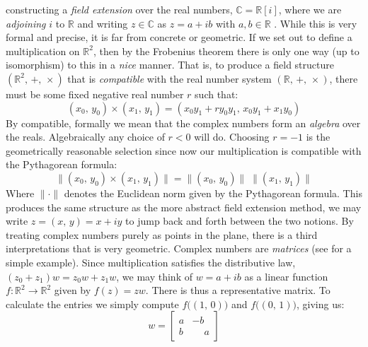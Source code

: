 \documentclass{article}
\theoremstyle{definition}
\begin{document}
        constructing a \textit{field extension} over the real numbers,
        $\mathbb{C}=\mathbb{R}[i]$, where we are \textit{adjoining} $i$ to
        $\mathbb{R}$ and writing $z\in\mathbb{C}$ as $z=a+ib$ with
        $a,b\in\mathbb{R}$ \cite[p.~512]{DummitAndFooteAbstractAlgebra}.
        While this is very formal and precise, it is far from concrete or
        geometric. If we set out to define a multiplication on $\mathbb{R}^{2}$,
        then by the Frobenius theorem \cite[p.~452]{JacobsonBasicAlgebraI}
        there is only one way (up to isomorphism) to this in a \textit{nice}
        manner. That is, to produce a field structure
        $(\mathbb{R}^{2},\,+,\,\times)$ that is \textit{compatible} with the
        real number system $(\mathbb{R},\,+,\,\times)$, there must be some
        fixed negative real number $r$ such that:
        \begin{equation}
            (x_{0},\,y_{0})\times(x_{1},\,y_{1})
            =(x_{0}y_{1}+ry_{0}y_{1},\,x_{0}y_{1}+x_{1}y_{0})
        \end{equation}
        By compatible, formally we mean that the complex numbers form an
        \textit{algebra} over the reals.
        Algebraically any choice of $r<0$ will do.
        Choosing $r=-1$ is the geometrically reasonable selection since now
        our multiplication is compatible with the Pythagorean formula:
        \begin{equation}
            \|(x_{0},\,y_{0})\times(x_{1},\,y_{1})\|
            =\|(x_{0},\,y_{0})\|\;\|(x_{1},\,y_{1})\|
        \end{equation}
        Where $\|\cdot\|$ denotes the Euclidean norm given by the
        Pythagorean formula. This produces the same structure as the more
        abstract field extension method, we may write
        $z=(x,\,y)=x+iy$ to jump back and forth between the two notions.
        By treating complex numbers purely as points in the plane, there is
        a third interpretations that is very geometric. Complex numbers are
        \textit{matrices} (see \cite[p.~25]{PetersenLinearAlgebra} for a
        simple example). Since multiplication satisfies the
        distributive law, $(z_{0}+z_{1})w=z_{0}w+z_{1}w$, we may think of
        $w=a+ib$ as a linear function
        $f:\mathbb{R}^{2}\rightarrow\mathbb{R}^{2}$ given by $f(z)=zw$.
        There is thus a representative matrix. To calculate the entries
        we simply compute $f\big((1,\,0)\big)$ and $f\big((0,\,1)\big)$,
        giving us:
        \begin{equation}
            w=
            \begin{bmatrix}
                a&-b\\
                b&\phantom{+}a
            \end{bmatrix}
        \end{equation}
\end{document}
